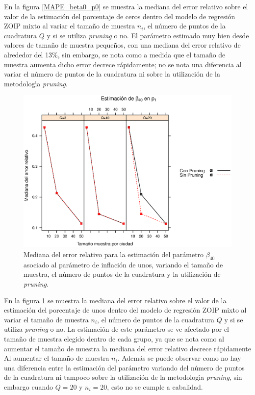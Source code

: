 En la figura \ref{MAPE_beta0_p0} se muestra la mediana del error relativo sobre el valor de la estimaci\'{o}n del porcentaje de ceros dentro del modelo de regresi\'{o}n ZOIP mixto al variar el tama\~{n}o de muestra $n_i$, el n\'{u}mero de puntos de la cuadratura $Q$ y si se utiliza \textit{pruning} o no. El par\'{a}metro estimado muy bien desde valores de tama\~{n}o de muestra peque\~{n}os, con una mediana del error relativo de alrededor del 13\%, sin embargo, se nota como a medida que el tama\~{n}o de muestra aumenta dicho error decrece r\'{a}pidamente; no se nota una diferencia al variar el n\'{u}mero de puntos de la cuadratura ni sobre la utilizaci\'{o}n de la metodolog\'{\i}a \textit{pruning}.\\

\begin{figure}
	\begin{center}
		\includegraphics[scale=0.6]{MAPE_beta0_p1.eps}	
		\caption{Mediana del error relativo para la estimaci\'{o}n del par\'{a}metro $\beta_{40}$ asociado al par\'{a}metro de inflaci\'{o}n de unos, variando el tama\~{n}o de muestra, el n\'{u}mero de puntos de la cuadratura y la utilizaci\'{o}n de \textit{pruning}.}
		\label{MAPE_beta0_p1}
	\end{center}
\end{figure}

En la figura \ref{MAPE_beta0_p1} se muestra la mediana del error relativo sobre el valor de la estimaci\'{o}n del porcentaje de unos dentro del modelo de regresi\'{o}n ZOIP mixto al variar el tama\~{n}o de muestra $n_i$, el n\'{u}mero de puntos de la cuadratura $Q$ y si se utiliza \textit{pruning} o no. La estimaci\'{o}n de este par\'{a}metro se ve afectado por el tama\~{n}o de muestra elegido dentro de cada grupo, ya que se nota como al aumentar el tama\~{n}o de muestra la mediana del error relativo decrece r\'{a}pidamente Al aumentar el tama\~{n}o de muestra $n_i$. Adem\'{a}s se puede observar como no hay una diferencia entre la estimaci\'{o}n del par\'{a}metro variando del n\'{u}mero de puntos de la cuadratura ni tampoco sobre la utilizaci\'{o}n de la metodolog\'{\i}a \textit{pruning}, sin embargo cuando $Q=20$ y $n_i=20$, esto no se cumple a cabalidad.\\

